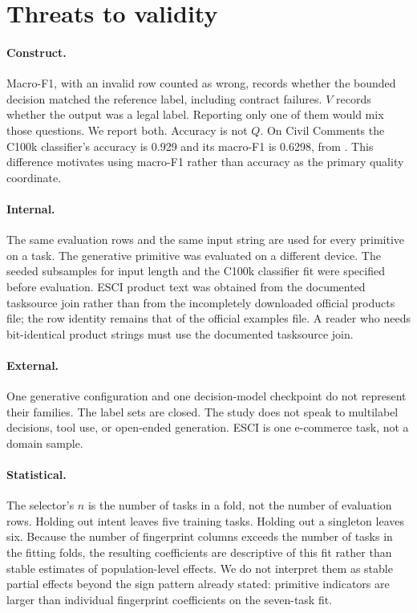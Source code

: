 \section{Threats to validity}
\label{sec:threats}

\paragraph{Construct.}
Macro-F1, with an invalid row counted as wrong, records whether the bounded decision matched the reference label, including contract failures. \(V\) records whether the output was a legal label. Reporting only one of them would mix those questions. We report both. Accuracy is not \(Q\). On Civil Comments the C100k classifier's accuracy is 0.929 and its macro-F1 is 0.6298, from . This difference motivates using macro-F1 rather than accuracy as the primary quality coordinate.

\paragraph{Internal.}
The same evaluation rows and the same input string are used for every primitive on a task. The generative primitive was evaluated on a different device. The seeded subsamples for input length and the C100k classifier fit were specified before evaluation. ESCI product text was obtained from the documented tasksource join rather than from the incompletely downloaded official products file; the row identity remains that of the official examples file. A reader who needs bit-identical product strings must use the documented tasksource join.

\paragraph{External.}
One generative configuration and one decision-model checkpoint do not represent their families. The label sets are closed. The study does not speak to multilabel decisions, tool use, or open-ended generation. ESCI is one e-commerce task, not a domain sample.

\paragraph{Statistical.}
The selector's \(n\) is the number of tasks in a fold, not the number of evaluation rows. Holding out intent leaves five training tasks. Holding out a singleton leaves six. Because the number of fingerprint columns exceeds the number of tasks in the fitting folds, the resulting coefficients are descriptive of this fit rather than stable estimates of population-level effects. We do not interpret them as stable partial effects beyond the sign pattern already stated: primitive indicators are larger than individual fingerprint coefficients on the seven-task fit.
